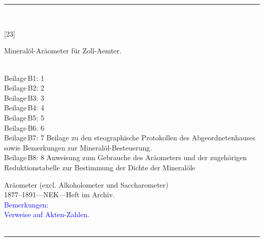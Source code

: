 \\
\vspace*{-2.5pt}\\
\parbox{\textwidth}{%
\rule{\textwidth}{1pt}\vspace*{-3mm}\\
\begin{minipage}[t]{0.15\textwidth}\vspace{0pt}
\Huge\rule[-4mm]{0cm}{1cm}[23]
\end{minipage}
\hfill
\begin{minipage}[t]{0.85\textwidth}\vspace{0pt}
\large Mineralöl-Aräometer für Zoll-Aemter.\rule[-2mm]{0mm}{2mm}
{\footnotesize \\{}
Beilage\,B1: 1\\
Beilage\,B2: 2\\
Beilage\,B3: 3\\
Beilage\,B4: 4\\
Beilage\,B5: 5\\
Beilage\,B6: 6\\
Beilage\,B7: 7 Beilage zu den steographische Protokollen des Abgeordnetenhauses sowie Bemerkungen zur Mineralöl-Besteuerung.\\
Beilage\,B8: 8 Anweisung zum Gebrauche des Aräometers und der zugehörigen Reduktionstabelle zur Bestimmung der Dichte der Mineralöle\\
}
\end{minipage}
{\footnotesize\flushright
Aräometer (excl. Alkoholometer und Saccharometer)\\
}
1877--1891\quad---\quad NEK\quad---\quad Heft im Archiv.\\
\textcolor{blue}{Bemerkungen:\\{}
Verweise auf Akten-Zahlen.\\{}
}
\\[-15pt]
\rule{\textwidth}{1pt}
}
\\
\vspace*{-2.5pt}\\
